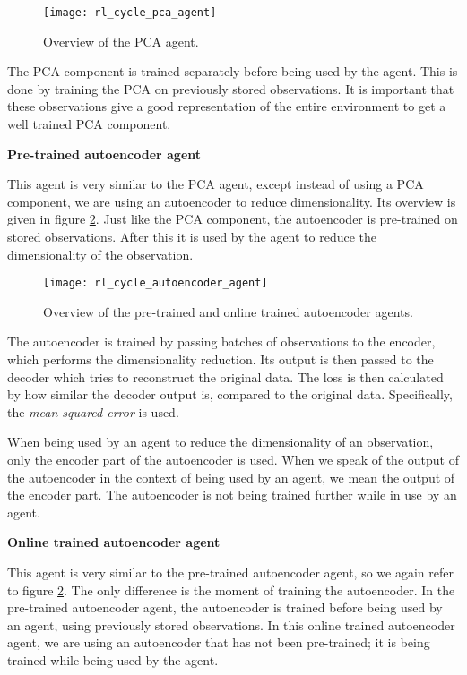 \begin{figure}[h]
    \centering
    \texttt{[image: rl\_cycle\_pca\_agent]}
    \caption{Overview of the PCA agent.}
    \label{fig:rl_cycle_pca}
\end{figure}

The PCA component is trained separately before being used by the agent. This is done by training the PCA on previously stored observations. It is important that these observations give a good representation of the entire environment to get a well trained PCA component. \par

\noindent \textbf{Pre-trained autoencoder agent}\par
\noindent This agent is very similar to the PCA agent, except instead of using a PCA component, we are using an autoencoder to reduce dimensionality. Its overview is given in figure \ref{fig:rl_cycle_ae}. Just like the PCA component, the autoencoder is pre-trained on stored observations. After this it is used by the agent to reduce the dimensionality of the observation. 

\begin{figure}[h]
    \centering
    \texttt{[image: rl\_cycle\_autoencoder\_agent]}
    \caption{Overview of the pre-trained and online trained autoencoder agents.}
    \label{fig:rl_cycle_ae}
\end{figure}

The autoencoder is trained by passing batches of observations to the encoder, which performs the dimensionality reduction. Its output is then passed to the decoder which tries to reconstruct the original data. The loss is then calculated by how similar the decoder output is, compared to the original data. Specifically, the \emph{mean squared error} is used.

When being used by an agent to reduce the dimensionality of an observation, only the encoder part of the autoencoder is used. When we speak of the output of the autoencoder in the context of being used by an agent, we mean the output of the encoder part. The autoencoder is not being trained further while in use by an agent. \par

\noindent \textbf{Online trained autoencoder agent}\par
\noindent  This agent is very similar to the pre-trained autoencoder agent, so we again refer to figure \ref{fig:rl_cycle_ae}. The only difference is the moment of training the autoencoder. In the pre-trained autoencoder agent, the autoencoder is trained before being used by an agent, using previously stored observations. In this online trained autoencoder agent, we are using an autoencoder that has not been pre-trained; it is being trained while being used by the agent. 

